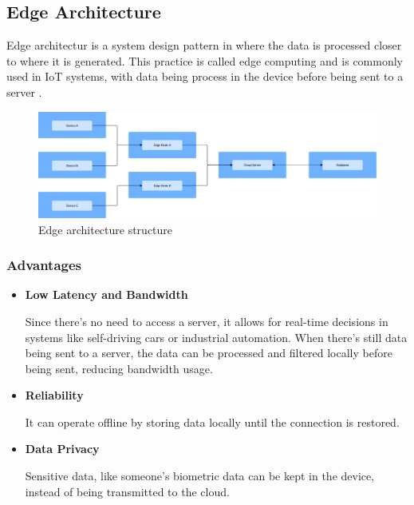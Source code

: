\subsection{Edge Architecture}
Edge architectur is a system design pattern in where the data is processed
closer to where it is generated. This practice is called edge computing and
is commonly used in IoT systems, with data being process in the device
before being sent to a server \cite{s20226441}.

\begin{figure}[H]
	\centering
	\includegraphics[width=\textwidth, height=0.5\textheight, keepaspectratio]{Chapters/Figures/Architectures/Edge.pdf}
	\caption{Edge architecture structure}
	\label{fig:architectures:edge}
\end{figure}

\subsubsection{Advantages}

\begin{itemize}


	\item \textbf{Low Latency and Bandwidth}

	      Since there's no need to access a server, it allows for real-time decisions
	      in systems like self-driving cars or industrial automation. When there's
	      still data being sent to a server, the data can be processed and filtered
	      locally before being sent, reducing bandwidth usage.


	\item \textbf{Reliability}

	      It can operate offline by storing data locally until the connection is
	      restored.

	\item \textbf{Data Privacy}

	      Sensitive data, like someone's biometric data can be kept in the device,
	      instead of being transmitted to the cloud.

\end{itemize}

